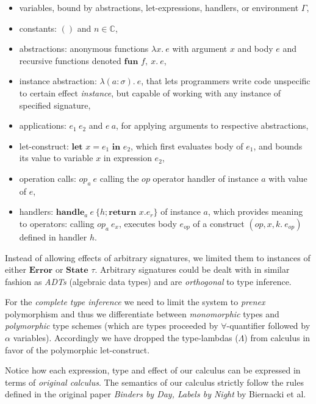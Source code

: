 \documentclass[declaration,shortabstract]{iithesis}
\theoremstyle{definition} \newtheorem{definition}{Definition}[section]
\newcommand{\lam}[1][x]{\ensuremath{\lambda #1.\:}}
\newcommand{\fun}[1][f,\:x]{\ensuremath{\textbf{fun } #1.\:}}
\begin{document}
\begin{itemize}
    \item variables, bound by abstractions, let-expressions, handlers, or environment $\Gamma$,
    \item constants: $()$ and $n \in \mathbb{C}$,
    \item abstractions: anonymous functions $\lam e$ with argument $x$ and body $e$ and recursive functions denoted $\fun e$,
    \item instance abstraction: $\lam[(a:\sigma)]e$, that lets programmers write code
    unspecific to certain effect \textit{instance}, but capable of working with any
    instance of specified signature,
    \item applications: $e_1\:e_2$ and $e\:a$, for applying arguments to respective abstractions, 
    \item let-construct: $\textbf{let } x = e_1 \textbf{ in } e_2$, which first evaluates body of $e_1$,
    and bounds its value to variable $x$ in expression $e_2$,
    \item operation calls: $op_a\:e$ calling the $op$ operator handler of instance $a$ with value
    of $e$,
    \item handlers: $\textbf{handle}_a \: e\: \{h;\textbf{return } x. e_r\}$ of instance $a$, 
    which provides meaning to operators: calling $op_a\:e_x$, executes body $e_{op}$ of
    a construct $(op, x, k.\:e_{op})$ defined in handler $h$.
\end{itemize}

Instead of allowing effects of arbitrary signatures, we limited them to instances
of either $\textbf{Error}$ or  $\textbf{State }\tau$.
Arbitrary signatures could be dealt with in similar fashion as \textit{ADTs}
(algebraic data types) and are \textit{orthogonal} to type inference.

For the \textit{complete type inference} we need to limit the system to \textit{prenex}
polymorphism and thus we differentiate between \textit{monomorphic} types and \textit{polymorphic}
type schemes (which are types proceeded by $\forall$-quantifier followed by $\alpha$ variables).
Accordingly we have dropped the type-lambdas ($\Lambda$) from calculus in favor of the
polymorphic let-construct.

Notice how each expression, type and effect of our calculus can be expressed in terms of \textit{original calculus}. The semantics of our calculus strictly follow the rules defined in the original paper \textit{Binders by Day, Labels by Night} by Biernacki et al\cite{binders-labels}.
\end{document}
